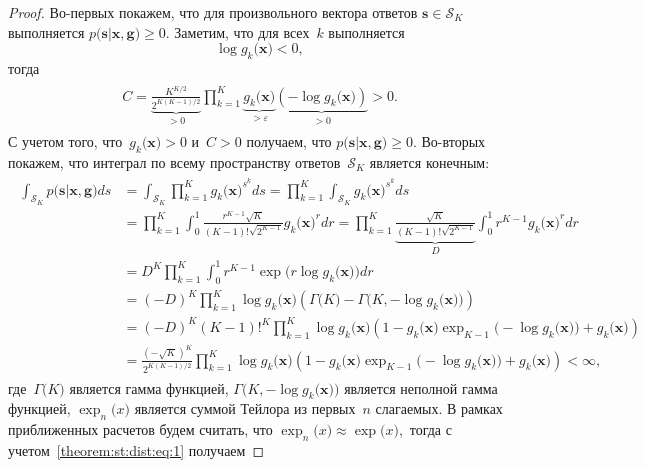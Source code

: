 \documentclass[12pt]{a&t}
\begin{document}
\begin{proof}
	Во-первых покажем, что для произвольного вектора ответов $\mathbf{s} \in \mathcal{S}_K$ выполняется $p\bigr(\mathbf{s}|\mathbf{x}, \mathbf{g}\bigr) \geq 0$. Заметим, что для всех~$k$ выполняется
	\[\log g_k\bigr(\mathbf{x}\bigr) < 0,\] тогда
\begin{gather}
\begin{aligned}
	C=\underbrace{\frac{K^{K/2}}{2^{K(K-1)/2}}}_{>0}\prod_{k=1}^{K}\underbrace{g_k\bigr(\mathbf{x}\bigr)}_{>\varepsilon}\underbrace{\left(-\log g_k\bigr(\mathbf{x}\bigr)\right)}_{>0} > 0.
\end{aligned}
\end{gather}
С учетом того, что~$g_k\bigr(\mathbf{x}\bigr) >0$ и~$C>0$ получаем, что $p\bigr(\mathbf{s}|\mathbf{x}, \mathbf{g}\bigr) \geq 0$.
	Во-вторых покажем, что интеграл по всему пространству ответов~$\mathcal{S}_K$ является конечным:
	\begin{gather}
	\label{theorem:st:dist:eq:1}
	\begin{aligned}
		\int_{\mathcal{S}_K}p\bigr(\mathbf{s}|\mathbf{x}, \mathbf{g}\bigr)ds &= \int_{\mathcal{S}_K}\prod_{k=1}^{K}g_k\bigr(\mathbf{x}\bigr)^{s^k}ds = \prod_{k=1}^{K}\int_{\mathcal{S}_K}g_k\bigr(\mathbf{x}\bigr)^{s^k}ds\\ 
		& = \prod_{k=1}^{K}\int_{0}^{1}\frac{r^{K-1}\sqrt{K}}{\left(K-1\right)!\sqrt{2^{K-1}}}g_k\bigr(\mathbf{x}\bigr)^{r}dr = \prod_{k=1}^{K}\underbrace{\frac{\sqrt{K}}{\left(K-1\right)!\sqrt{2^{K-1}}}}_{D}\int_{0}^{1}r^{K-1}g_k\bigr(\mathbf{x}\bigr)^{r}dr \\
		& = D^K\prod_{k=1}^{K} \int_{0}^{1}r^{K-1}\exp\bigr(r\log g_k\bigr(\mathbf{x}\bigr)\bigr)dr \\
		& = \left(-D\right)^K\prod_{k=1}^{K}\log g_k\bigr(\mathbf{x}\bigr)\left(\Gamma\bigr(K\bigr) - \Gamma\bigr(K, -\log g_k\bigr(\mathbf{x}\bigr)\bigr)\right) \\
		& = \left(-D\right)^K\left(K-1\right)!^K\prod_{k=1}^{K}\log g_k\bigr(\mathbf{x}\bigr)\left(1 -g_k\bigr(\mathbf{x}\bigr) \exp_{K-1}\bigr(-\log g_k\bigr(\mathbf{x}\bigr)\bigr)+g_k\bigr(\mathbf{x}\bigr)\right) \\
		& = \frac{\left(-\sqrt{K}\right)^K}{2^{K(K-1)/2}}\prod_{k=1}^{K}\log g_k\bigr(\mathbf{x}\bigr)\left(1 -g_k\bigr(\mathbf{x}\bigr) \exp_{K-1}\bigr(-\log g_k\bigr(\mathbf{x}\bigr)\bigr)+g_k\bigr(\mathbf{x}\bigr)\right) < \infty,
	\end{aligned}
	\end{gather}
где~$\Gamma\bigr(K\bigr)$ является гамма функцией, $\Gamma\bigr(K, -\log g_k\bigr(\mathbf{x}\bigr)\bigr)$ является неполной гамма функцией, $\exp_{n}\bigr(x\bigr)$ является суммой Тейлора из первых~$n$ слагаемых. В рамках приближенных расчетов будем считать, что $\exp_{n}\bigr(x\bigr)\approx\exp\bigr(x\bigr),$ тогда с учетом~\eqref{theorem:st:dist:eq:1} получаем

\end{proof}
\end{document}
